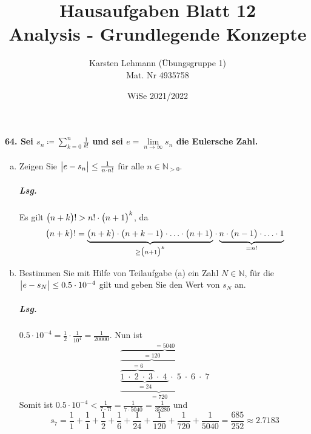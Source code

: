 \documentclass{scrreprt}
\author{Karsten Lehmann (Übungsgruppe 1)\\Mat. Nr 4935758}
\date{WiSe 2021/2022}
\title{Hausaufgaben Blatt 12\\Analysis - Grundlegende Konzepte}
\begin{document}
\paragraph{64. Sei $s_n \coloneqq \sum_{k = 0}^n \frac{1}{k!}$ und sei
  $e = \underset{n \to \infty}\lim s_n$ die Eulersche Zahl.}
\begin{enumerate}[(a)]
\item Zeigen Sie $\abs\big{e - s_n} \leq \frac{1}{n \cdot n!}$ für alle
  $n \in \mathbb{N}_{> 0}$.

  \subparagraph{Lsg.} Es gilt $\qty\big(n + k)! > n! \cdot \qty\big(n + 1)^k$, da
  \[
    \qty\big(n + k)! =
    \underset{\geq \qty\big(n + 1)^k}{
      \underbrace{
        \qty\big(n + k) \cdot \qty\big(n + k - 1) \cdot
        \ldots \cdot \qty\big(n + 1)
      }
    } \cdot
    \underset{= n!}{\underbrace{n \cdot \qty\big(n - 1) \cdot \ldots \cdot 1}}
  \]

\item Bestimmen Sie mit Hilfe von Teilaufgabe (a) ein Zahl $N \in \mathbb{N}$,
  für die $\abs\big{e - s_N} \leq 0.5 \cdot 10^{-4}$ gilt und geben Sie den Wert
  von $s_N$ an.

  \subparagraph{Lsg.} $0.5 \cdot 10^{-4} = \frac{1}{2} \cdot \frac{1}{10^4} =
  \frac{1}{20000}$.
  Nun ist
  \[
    \overset{= 5040}{
      \overbrace{
        \underset{= 720}{
          \underbrace{
            \overset{= 120}{
              \overbrace{
                \underset{= 24}{
                  \underbrace{
                    \overset{= 6}{
                      \overbrace{
                        1 \; \cdot \; 2 \; \cdot \; 3 \;
                      }
                    } \cdot \; 4 \;
                  }
                } \cdot \; 5 \;
              }
            } \cdot \; 6 \;
          }
        } \cdot \; 7
      }
    }
  \]
  Somit ist $0.5 \cdot 10^{-4} < \frac{1}{7 \cdot 7!} = \frac{1}{7 \cdot 5040}
  = \frac{1}{35280}$ und
  \[
    s_7 = \frac{1}{1} + \frac{1}{1} + \frac{1}{2} + \frac{1}{6} + \frac{1}{24}
    + \frac{1}{120} + \frac{1}{720} + \frac{1}{5040}
    = \frac{685}{252} \approx 2.7183
  \]
\end{enumerate}
\end{document}
